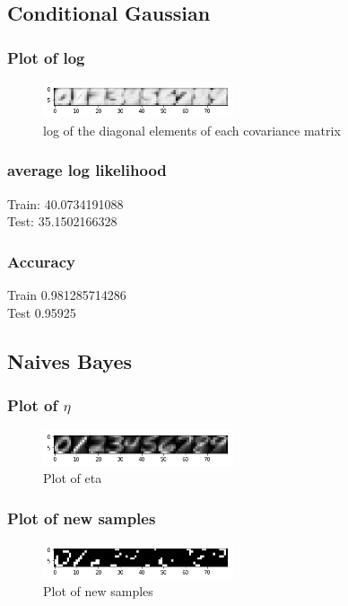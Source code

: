 \documentclass[letterpaper, 12]{article}
\begin{document}
\subsection{Conditional Gaussian}
\subsubsection{Plot of log}
\begin{figure}[H]
\centering
\includegraphics[width=0.5\textwidth]{log_sigma_k.png}
\caption{\label{}log of the diagonal elements of each covariance matrix}
\end{figure}

\subsubsection{average log likelihood}
Train: 40.0734191088 \\
Test: 35.1502166328\\

\subsubsection{Accuracy}
Train 0.981285714286\\
Test 0.95925\\



\subsection{Naives Bayes}
\subsubsection{Plot of $\eta$}
\begin{figure}[H]
\centering
\includegraphics[width=0.5\textwidth]{eta_plot.png}
\caption{\label{}Plot of eta}
\end{figure}


\subsubsection{Plot of new samples}
\begin{figure}[H]
\centering
\includegraphics[width=0.5\textwidth]{q3_gen_new.png}
\caption{\label{}Plot of new samples}
\end{figure}
\end{document}
